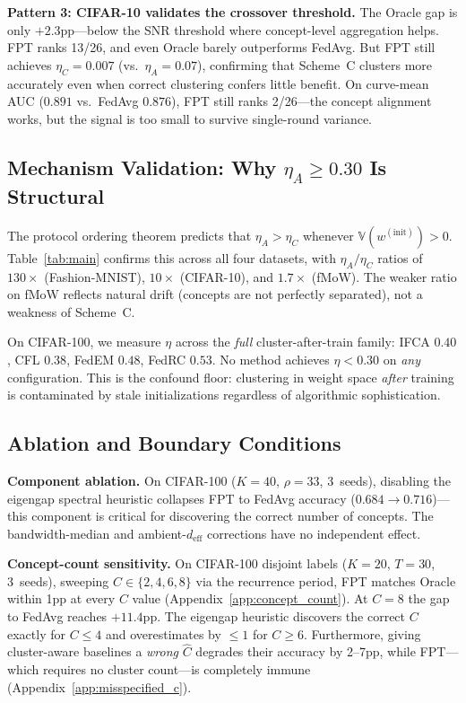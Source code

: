 \documentclass[11pt]{article}
\newcommand{\V}{\mathbb{V}}
\begin{document}
\textbf{Pattern 3: CIFAR-10 validates the crossover threshold.}
The Oracle gap is only $+2.3$pp---below the SNR threshold where concept-level aggregation helps.
FPT ranks 13/26, and even Oracle barely outperforms FedAvg.
But FPT still achieves $\eta_C = 0.007$ (vs.\ $\eta_A = 0.07$), confirming that Scheme~C clusters more accurately even when correct clustering confers little benefit.
On curve-mean AUC ($0.891$ vs.\ FedAvg $0.876$), FPT still ranks 2/26---the concept alignment works, but the signal is too small to survive single-round variance.

\subsection{Mechanism Validation: Why $\eta_A \ge 0.30$ Is Structural}

The protocol ordering theorem predicts that $\eta_A > \eta_C$ whenever $\V(w^{(\mathrm{init})}) > 0$.
Table~\ref{tab:main} confirms this across all four datasets, with $\eta_A / \eta_C$ ratios of $130\times$ (Fashion-MNIST), $10\times$ (CIFAR-10), and $1.7\times$ (fMoW).
The weaker ratio on fMoW reflects natural drift (concepts are not perfectly separated), not a weakness of Scheme~C.

On CIFAR-100, we measure $\eta$ across the \emph{full} cluster-after-train family: IFCA $0.40$, CFL $0.38$, FedEM $0.48$, FedRC $0.53$.
No method achieves $\eta < 0.30$ on \emph{any} configuration.
This is the confound floor: clustering in weight space \emph{after} training is contaminated by stale initializations regardless of algorithmic sophistication.


\subsection{Ablation and Boundary Conditions}

\textbf{Component ablation.}
On CIFAR-100 ($K{=}40$, $\rho{=}33$, 3~seeds), disabling the eigengap spectral heuristic collapses FPT to FedAvg accuracy ($0.684 \to 0.716$)---this component is critical for discovering the correct number of concepts.
The bandwidth-median and ambient-$d_{\mathrm{eff}}$ corrections have no independent effect.

\textbf{Concept-count sensitivity.}
On CIFAR-100 disjoint labels ($K{=}20$, $T{=}30$, 3~seeds), sweeping $C \in \{2,4,6,8\}$ via the recurrence period, FPT matches Oracle within 1pp at every $C$ value (Appendix~\ref{app:concept_count}).
At $C{=}8$ the gap to FedAvg reaches $+11.4$pp.
The eigengap heuristic discovers the correct $C$ exactly for $C \le 4$ and overestimates by $\le 1$ for $C \ge 6$.
Furthermore, giving cluster-aware baselines a \emph{wrong} $\hat C$ degrades their accuracy by 2--7pp, while FPT---which requires no cluster count---is completely immune (Appendix~\ref{app:misspecified_c}).
\end{document}
